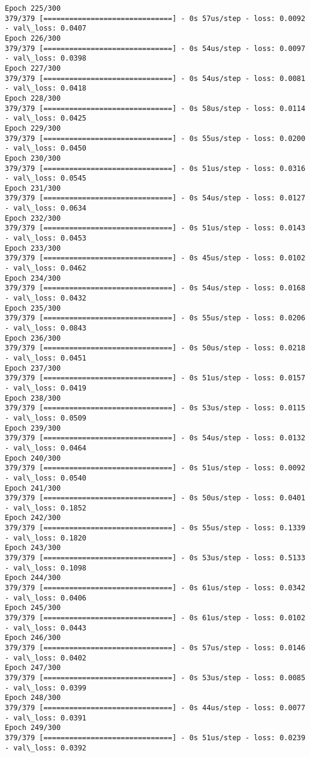 \documentclass[11pt]{article}
\begin{document}
\begin{Verbatim}[commandchars=\\\{\}]
Epoch 225/300
379/379 [==============================] - 0s 57us/step - loss: 0.0092 - val\_loss: 0.0407
Epoch 226/300
379/379 [==============================] - 0s 54us/step - loss: 0.0097 - val\_loss: 0.0398
Epoch 227/300
379/379 [==============================] - 0s 54us/step - loss: 0.0081 - val\_loss: 0.0418
Epoch 228/300
379/379 [==============================] - 0s 58us/step - loss: 0.0114 - val\_loss: 0.0425
Epoch 229/300
379/379 [==============================] - 0s 55us/step - loss: 0.0200 - val\_loss: 0.0450
Epoch 230/300
379/379 [==============================] - 0s 51us/step - loss: 0.0316 - val\_loss: 0.0545
Epoch 231/300
379/379 [==============================] - 0s 54us/step - loss: 0.0127 - val\_loss: 0.0634
Epoch 232/300
379/379 [==============================] - 0s 51us/step - loss: 0.0143 - val\_loss: 0.0453
Epoch 233/300
379/379 [==============================] - 0s 45us/step - loss: 0.0102 - val\_loss: 0.0462
Epoch 234/300
379/379 [==============================] - 0s 54us/step - loss: 0.0168 - val\_loss: 0.0432
Epoch 235/300
379/379 [==============================] - 0s 55us/step - loss: 0.0206 - val\_loss: 0.0843
Epoch 236/300
379/379 [==============================] - 0s 50us/step - loss: 0.0218 - val\_loss: 0.0451
Epoch 237/300
379/379 [==============================] - 0s 51us/step - loss: 0.0157 - val\_loss: 0.0419
Epoch 238/300
379/379 [==============================] - 0s 53us/step - loss: 0.0115 - val\_loss: 0.0509
Epoch 239/300
379/379 [==============================] - 0s 54us/step - loss: 0.0132 - val\_loss: 0.0464
Epoch 240/300
379/379 [==============================] - 0s 51us/step - loss: 0.0092 - val\_loss: 0.0540
Epoch 241/300
379/379 [==============================] - 0s 50us/step - loss: 0.0401 - val\_loss: 0.1852
Epoch 242/300
379/379 [==============================] - 0s 55us/step - loss: 0.1339 - val\_loss: 0.1820
Epoch 243/300
379/379 [==============================] - 0s 53us/step - loss: 0.5133 - val\_loss: 0.1098
Epoch 244/300
379/379 [==============================] - 0s 61us/step - loss: 0.0342 - val\_loss: 0.0406
Epoch 245/300
379/379 [==============================] - 0s 61us/step - loss: 0.0102 - val\_loss: 0.0443
Epoch 246/300
379/379 [==============================] - 0s 57us/step - loss: 0.0146 - val\_loss: 0.0402
Epoch 247/300
379/379 [==============================] - 0s 53us/step - loss: 0.0085 - val\_loss: 0.0399
Epoch 248/300
379/379 [==============================] - 0s 44us/step - loss: 0.0077 - val\_loss: 0.0391
Epoch 249/300
379/379 [==============================] - 0s 51us/step - loss: 0.0239 - val\_loss: 0.0392

\end{Verbatim}
\end{document}
